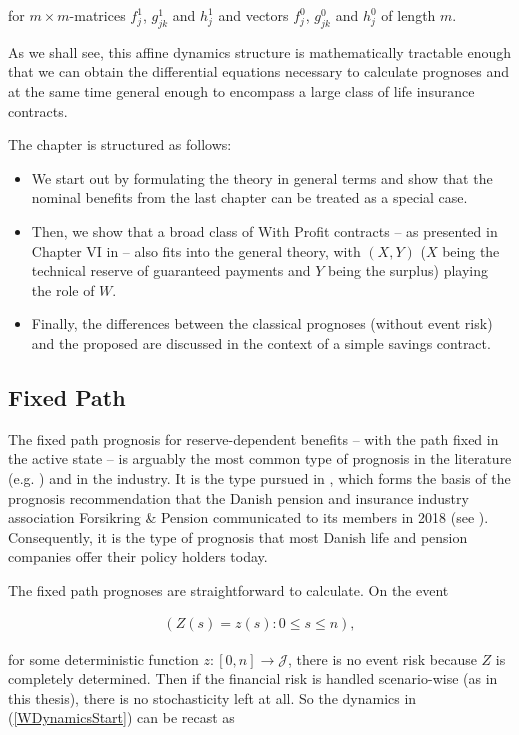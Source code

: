 \documentclass{article}
\newcommand{\1}[1]{\mathbbm{1}_{\left\lbrace #1 \right\rbrace}}
\theoremstyle{break}
\theoremstyle{remark}
\numberwithin{equation}{section}
\begin{document}
for $m \times m$-matrices $f_j^1$, $g_{jk}^1$ and $ h_j^1$ and vectors $f_j^0$, $g_{jk}^0$ and $ h_j^0$ of length $m$.

As we shall see, this affine dynamics structure is mathematically tractable enough that we can obtain the differential equations necessary to calculate prognoses and at the same time general enough to encompass a large class of life insurance contracts.

The chapter is structured as follows:

\begin{itemize}
	\item We start out by formulating the theory in general terms and show that the nominal benefits from the last chapter can be treated as a special case. 
	\item Then, we show that a broad class of With Profit contracts -- as presented in Chapter VI in \cite{Liv2Bog} -- also fits into the general theory, with $(X,Y)$ ($X$ being the technical reserve of guaranteed payments and $Y$ being the surplus) playing the role of $W$.
	\item Finally, the differences between the classical prognoses (without event risk) and the proposed are discussed in the context of a simple savings contract.
\end{itemize}



\subsection{Fixed Path}

The fixed path prognosis for reserve-dependent benefits -- with the path fixed in the active state -- is arguably the most common type of prognosis in the literature (e.g. \cite{NinnaReitzel}) and in the industry. It is the type pursued in \cite{Munk}, which forms the basis of the prognosis recommendation that the Danish pension and insurance industry association Forsikring \& Pension communicated to its members in 2018 (see \cite{Henstilling}). Consequently, it is the type of prognosis that most Danish life and pension companies offer their policy holders today.

The fixed path prognoses are straightforward to calculate. On the event

\begin{align*}
	\left( Z(s) = z(s) : 0 \leq s \leq n \right),
\end{align*}

for some deterministic function $z: [0,n] \to \mathcal{J}$, there is no event risk because $Z$ is completely determined. Then if the financial risk is handled scenario-wise (as in this thesis), there is no stochasticity left at all. So the dynamics in (\ref{WDynamicsStart}) can be recast as
\end{document}
